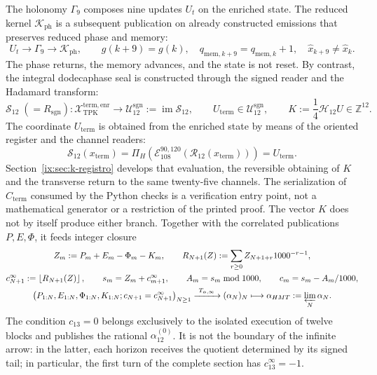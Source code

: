 The holonomy \(\Gamma_9\) composes nine updates \(U_t\) on the enriched
state. The reduced kernel \(\mathcal K_{\mathrm{ph}}\) is a subsequent publication
on already constructed emissions that preserves reduced phase and memory:
\[
 U_t\longrightarrow\Gamma_9\longrightarrow\mathcal K_{\mathrm{ph}},
 \qquad
 g(k+9)=g(k),\quad
 q_{\mathrm{mem},k+9}=q_{\mathrm{mem},k}+1,\quad
 \widehat x_{k+9}\neq\widehat x_k.
\]
The phase returns, the memory advances, and the state is not reset. By
contrast, the integral dodecaphase seal is constructed through the signed
reader and the Hadamard transform:
\[
 \mathcal S_{12}\;(=R_{\mathrm{sgn}}):
 \mathcal X_{\mathrm{TPK}}^{\mathrm{term,enr}}
 \longrightarrow
 \mathcal U_{12}^{\mathrm{sgn}}:=\operatorname{im}\mathcal S_{12},
 \qquad
 U_{\mathrm{term}}\in\mathcal U_{12}^{\mathrm{sgn}},
 \qquad
 K:=\frac14\mathcal H_{12}U\in\mathbb Z^{12}.
\]
The coordinate \(U_{\mathrm{term}}\) is obtained from the enriched state by
means of the oriented register and the channel readers:
\[
 \mathcal S_{12}(x_{\mathrm{term}})
 =\Pi_H\!\left(
   \mathcal E_{108}^{90,120}
   (\mathcal R_{12}(x_{\mathrm{term}}))\right)
 =U_{\mathrm{term}}.
\]
Section~\ref{ix:sec:k-registro} develops that evaluation, the reversible
obtaining of \(K\) and the transverse return to the same twenty-five channels.
The serialization of \(C_{\mathrm{term}}\) consumed by the Python checks is
a verification entry point, not a mathematical generator or a
restriction of the printed proof.
The vector \(K\) does not by itself produce either branch. Together with
the correlated publications \(P,E,\Phi\), it feeds integer closure
\[
 \begin{gathered}
 Z_m:=P_m+E_m-\Phi_m-K_m,\qquad
 R_{N+1}(Z):=\sum_{r\geq0}Z_{N+1+r}1000^{-r-1},\\
 c_{N+1}^{\infty}:=\left\lfloor R_{N+1}(Z)\right\rfloor,\qquad
 s_m=Z_m+c_{m+1}^{\infty},\qquad
 A_m=s_m\bmod1000,\qquad
 c_m=\frac{s_m-A_m}{1000},\\
 \bigl(P_{1:N},E_{1:N},\Phi_{1:N},K_{1:N};
       c_{N+1}=c_{N+1}^{\infty}\bigr)_{N\geq1}
 \xrightarrow{\ \mathsf T_{\alpha,\infty}\ }
 (\alpha_N)_N
 \longmapsto
 \alpha_{\mathrm{HMT}}:=\varprojlim_N\alpha_N.
 \end{gathered}
\]
The condition \(c_{13}=0\) belongs exclusively to the isolated execution of
twelve blocks and publishes the rational \(\alpha_{12}^{(0)}\). It is not the boundary
of the infinite arrow: in the latter, each horizon receives the quotient determined
by its signed tail; in particular, the first turn of the complete section
has \(c_{13}^{\infty}=-1\).
